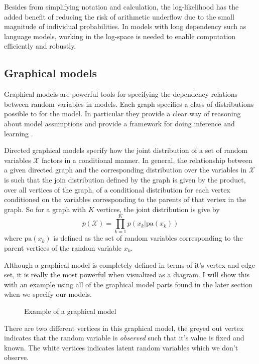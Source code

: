 Besides from simplifying notation and calculation, the log-likelihood has the added benefit of
reducing the risk of arithmetic underflow due to the small magnitude of
individual probabilities. In models with long dependency such as language
models, working in the log-space is needed to enable computation efficiently and robustly.

\subsection{Graphical models}
Graphical models are powerful tools for specifying the dependency relations
between random variables in models. Each graph specifies a class of
distributions possible to for the model. In particular they provide a clear way
of reasoning about model assumptions and provide a framework for doing inference
and learning \cite{Barber:2012:BRM:2207809}.

Directed graphical models specify how the joint distribution of a set of random
variables $\mathcal{X}$ factors in a conditional manner. In general, the
relationship between a given directed graph and the corresponding distribution
over the variables in $\mathcal{X}$ is such that the join distribution defined
by the graph is given by the product, over all vertices of the graph, of a
conditional distribution for each vertex conditioned on the variables
corresponding to the parents of that vertex in the graph. So for a graph with
$K$ vertices, the joint distribution is give by
\begin{equation}
  \label{eq:dir_graph_model_dist}
  p(\mathcal{X}) = \prod_{k=1}^K p(x_k | \text{pa}(x_k))
\end{equation}
where $\text{pa}(x_k)$ is defined as the set of random variables corresponding
to the parent vertices of the random variable $x_k$.

Although a graphical model is completely defined in terms of it's vertex and
edge set, it is really the most powerful when visualized as a diagram. I will
show this with an example using all of the graphical model parts found in the
later section when we specify our models.
\begin{figure}[H]
  \center
  \label{tikz:gm}
  \caption{Example of a graphical model}
\end{figure}
There are two different vertices in this graphical model, the greyed out vertex
indicates that the random variable is \textit{observed} such that it's value is
fixed and known. The white vertices indicates latent random variables which we
don't observe.


